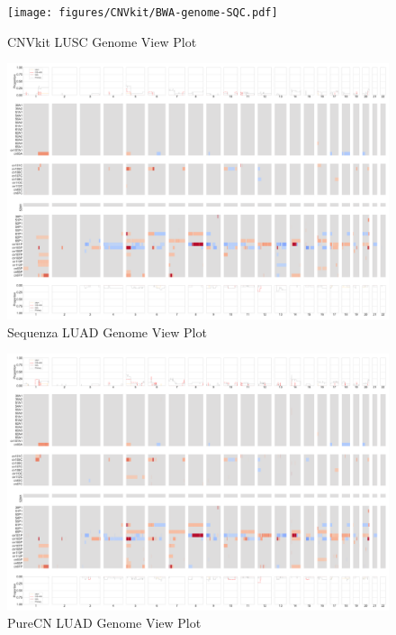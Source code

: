 \documentclass[11pt,a4paper,onecolumn,oneside]{report}
\begin{document}
                \begin{figure}[p]
                    \centering
                    \texttt{[image: figures/CNVkit/BWA-genome-SQC.pdf]}
                    \caption{CNVkit LUSC Genome View Plot}
                    \label{fig:PureCN-SQC-genome}
                \end{figure}

                \begin{figure}[p]
                    \centering
                    \includegraphics[width=\linewidth]{figures/Sequenza/BWA-genome-ADC.pdf}
                    \caption{Sequenza LUAD Genome View Plot}
                    \label{fig:sequenza-ADC-genome}
                \end{figure}

                \begin{figure}[p]
                    \centering
                    \includegraphics[width=\linewidth]{figures/PureCN/BWA-genome-ADC.pdf}
                    \caption{PureCN LUAD Genome View Plot}
                    \label{fig:PureCN-ADC-genome}
                \end{figure}
\end{document}

